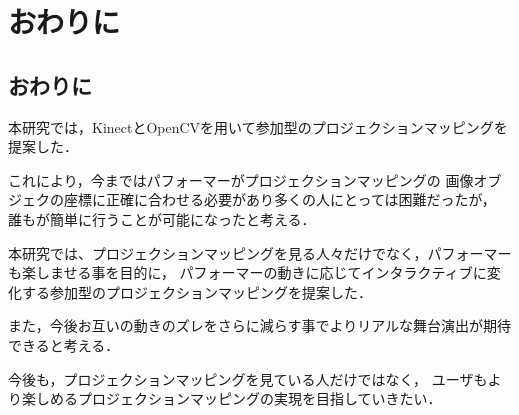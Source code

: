 \chapter{おわりに}
\thispagestyle{fancy}

\section{おわりに}

本研究では，KinectとOpenCVを用いて参加型のプロジェクションマッピングを提案した．

これにより，今まではパフォーマーがプロジェクションマッピングの
画像オブジェクの座標に正確に合わせる必要があり多くの人にとっては困難だったが，
誰もが簡単に行うことが可能になったと考える．

本研究では、プロジェクションマッピングを見る人々だけでなく，パフォーマーも楽しませる事を目的に，
パフォーマーの動きに応じてインタラクティブに変化する参加型のプロジェクションマッピングを提案した．

また，今後お互いの動きのズレをさらに減らす事でよりリアルな舞台演出が期待できると考える．

今後も，プロジェクションマッピングを見ている人だけではなく，
ユーザもより楽しめるプロジェクションマッピングの実現を目指していきたい．



